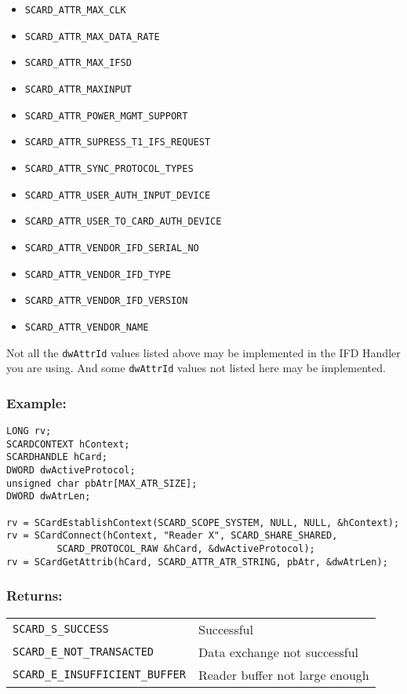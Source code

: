 \documentclass[a4paper,12pt]{article}
\newcommand{\example}{\subsubsection{Example:}}
\newcommand{\returns}{\subsubsection{Returns:}}
\begin{document}
\begin{itemize}
\item \texttt{SCARD\_ATTR\_MAX\_CLK}
\item \texttt{SCARD\_ATTR\_MAX\_DATA\_RATE}
\item \texttt{SCARD\_ATTR\_MAX\_IFSD}
\item \texttt{SCARD\_ATTR\_MAXINPUT}
\item \texttt{SCARD\_ATTR\_POWER\_MGMT\_SUPPORT}
\item \texttt{SCARD\_ATTR\_SUPRESS\_T1\_IFS\_REQUEST}
\item \texttt{SCARD\_ATTR\_SYNC\_PROTOCOL\_TYPES}
\item \texttt{SCARD\_ATTR\_USER\_AUTH\_INPUT\_DEVICE}
\item \texttt{SCARD\_ATTR\_USER\_TO\_CARD\_AUTH\_DEVICE}
\item \texttt{SCARD\_ATTR\_VENDOR\_IFD\_SERIAL\_NO}
\item \texttt{SCARD\_ATTR\_VENDOR\_IFD\_TYPE}
\item \texttt{SCARD\_ATTR\_VENDOR\_IFD\_VERSION}
\item \texttt{SCARD\_ATTR\_VENDOR\_NAME}
\end{itemize}

Not all the \texttt{dwAttrId} values listed above may be implemented in
the IFD Handler you are using. And some \texttt{dwAttrId} values not
listed here may be implemented.

\example

\begin{verbatim}
LONG rv;
SCARDCONTEXT hContext;
SCARDHANDLE hCard;
DWORD dwActiveProtocol;
unsigned char pbAtr[MAX_ATR_SIZE];
DWORD dwAtrLen;

rv = SCardEstablishContext(SCARD_SCOPE_SYSTEM, NULL, NULL, &hContext);
rv = SCardConnect(hContext, "Reader X", SCARD_SHARE_SHARED,
         SCARD_PROTOCOL_RAW &hCard, &dwActiveProtocol);
rv = SCardGetAttrib(hCard, SCARD_ATTR_ATR_STRING, pbAtr, &dwAtrLen);
\end{verbatim}

\returns

\begin{tabular}{ll}
\texttt{SCARD\_S\_SUCCESS}			& Successful\\
\texttt{SCARD\_E\_NOT\_TRANSACTED}		& Data exchange not successful\\
\texttt{SCARD\_E\_INSUFFICIENT\_BUFFER} & Reader buffer not large enough \\
\end{tabular}


\end{document}
